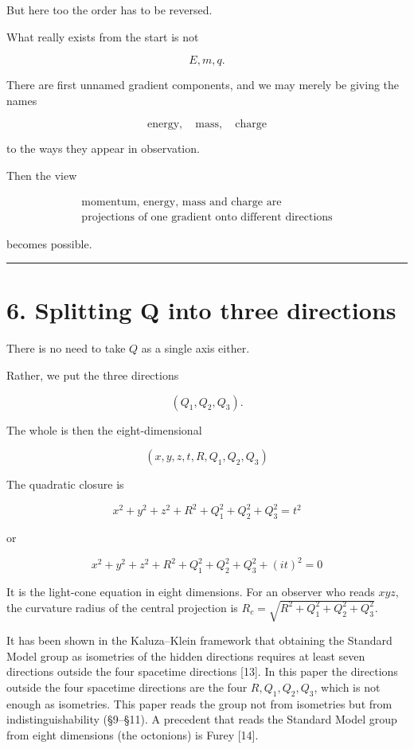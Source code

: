 \documentclass[
  a4paper,
]{article}
\begin{document}
But here too the order has to be reversed.

What really exists from the start is not

\[
E,m,q .
\]

There are first unnamed gradient components, and we may merely be giving
the names

\[
\text{energy},
\quad
\text{mass},
\quad
\text{charge}
\]

to the ways they appear in observation.

Then the view

\[
\boxed{
\begin{array}{c}
\text{momentum, energy, mass and charge are}\\
\text{projections of one gradient onto different directions}
\end{array}
}
\]

becomes possible.

\begin{center}\rule{0.5\linewidth}{0.5pt}\end{center}

\section{6. Splitting Q into three
directions}\label{splitting-q-into-three-directions}

There is no need to take \(Q\) as a single axis either.

Rather, we put the three directions

\[
(Q_1,Q_2,Q_3).
\]

The whole is then the eight-dimensional

\[
\boxed{
(x,y,z,t,R,Q_1,Q_2,Q_3)
}
\]

The quadratic closure is

\[
\boxed{
x^2+y^2+z^2
+R^2+Q_1^2+Q_2^2+Q_3^2
=
t^2
}
\]

or

\[
\boxed{
x^2+y^2+z^2
+R^2+Q_1^2+Q_2^2+Q_3^2+(it)^2=0
}
\]

It is the light-cone equation in eight dimensions. For an observer who
reads \(xyz\), the curvature radius of the central projection is
\(R_c=\sqrt{R^2+Q_1^2+Q_2^2+Q_3^2}\).

It has been shown in the Kaluza--Klein framework that obtaining the
Standard Model group as isometries of the hidden directions requires at
least seven directions outside the four spacetime directions {[}13{]}.
In this paper the directions outside the four spacetime directions are
the four \(R,Q_1,Q_2,Q_3\), which is not enough as isometries. This
paper reads the group not from isometries but from indistinguishability
(§9--§11). A precedent that reads the Standard Model group from eight
dimensions (the octonions) is Furey {[}14{]}.
\end{document}
